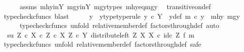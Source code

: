 \begin{isabellebody}
\ \ \ \ \isamarkupfalse%
\ assms\ mhy{\isacharunderscore}{\kern0pt}in{\isacharunderscore}{\kern0pt}Y\ mgy{\isacharunderscore}{\kern0pt}in{\isacharunderscore}{\kern0pt}Y\ mgy{\isacharunderscore}{\kern0pt}types\ mhy{}{\isacharunderscore}{\kern0pt}eq{\isacharunderscore}{\kern0pt}mgy{}\ \isamarkupfalse%
\ transitive{\isacharunderscore}{\kern0pt}on{\isacharunderscore}{\kern0pt}def\isanewline
\ \ \ \ \isamarkupfalse%
\ {\isacharparenleft}{\kern0pt}typecheck{\isacharunderscore}{\kern0pt}cfuncs{\isacharcomma}{\kern0pt}\ blast{\isacharparenright}{\kern0pt}\isanewline
\ \ \isamarkupfalse%
\ \isamarkupfalse%
\ y\ \ y{\isacharunderscore}{\kern0pt}type{\isacharbrackleft}{\kern0pt}type{\isacharunderscore}{\kern0pt}rule{\isacharbrackright}{\kern0pt}{\isacharcolon}{\kern0pt}\ {\isachardoublequoteopen}y\ {\isasymin}\isactrlsub c\ Y{\isachardoublequoteclose}\ \ y{\isacharunderscore}{\kern0pt}def{\isacharcolon}{\kern0pt}\ {\isachardoublequoteopen}m\ {\isasymcirc}\isactrlsub c\ y\ {\isacharequal}{\kern0pt}\ {\isasymlangle}mhy{}{\isacharcomma}{\kern0pt}\ mgy{}{\isasymrangle}{\isachardoublequoteclose}\isanewline
\ \ \ \ \isamarkupfalse%
\ {\isacharparenleft}{\kern0pt}typecheck{\isacharunderscore}{\kern0pt}cfuncs{\isacharcomma}{\kern0pt}\ unfold\ relative{\isacharunderscore}{\kern0pt}member{\isacharunderscore}{\kern0pt}def{}\ factors{\isacharunderscore}{\kern0pt}through{\isacharunderscore}{\kern0pt}def{}{\isacharcomma}{\kern0pt}\ auto{\isacharparenright}{\kern0pt}\isanewline
\ \ \isamarkupfalse%
\ {\isachardoublequoteopen}\ {\isasymlangle}s{\isacharcomma}{\kern0pt}u{\isasymrangle}\ {\isasymin}\isactrlbsub {\isacharparenleft}{\kern0pt}Z\ {\isasymtimes}\isactrlsub c\ X{\isacharparenright}{\kern0pt}\ {\isasymtimes}\isactrlsub c\ Z\ {\isasymtimes}\isactrlsub c\ X\isactrlesub \ {\isacharparenleft}{\kern0pt}Z\ {\isasymtimes}\isactrlsub c\ Y{\isacharcomma}{\kern0pt}\ distribute{\isacharunderscore}{\kern0pt}left\ Z\ X\ X\ {\isasymcirc}\isactrlsub c\ id\isactrlsub c\ Z\ {\isasymtimes}\isactrlsub f\ m{\isacharparenright}{\kern0pt}{\isachardoublequoteclose}\ \isanewline
\ \ \isamarkupfalse%
\ {\isacharparenleft}{\kern0pt}typecheck{\isacharunderscore}{\kern0pt}cfuncs{\isacharcomma}{\kern0pt}\ unfold\ relative{\isacharunderscore}{\kern0pt}member{\isacharunderscore}{\kern0pt}def{}\ factors{\isacharunderscore}{\kern0pt}through{\isacharunderscore}{\kern0pt}def{}{\isacharcomma}{\kern0pt}\ safe{\isacharparenright}{\kern0pt}\isanewline

\end{isabellebody}
